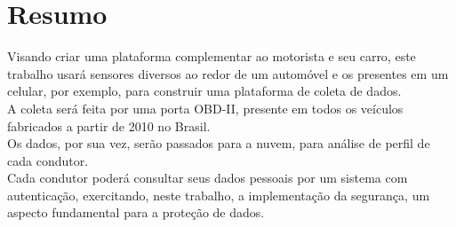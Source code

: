 \chapter*{Resumo}

\noindent Visando criar uma plataforma complementar ao motorista e seu carro, este trabalho usará sensores diversos ao redor de um automóvel e os presentes em um celular, por exemplo, para construir uma plataforma de coleta de dados.\\
A coleta será feita por uma porta OBD-II, presente em todos os veículos fabricados a partir de 2010 no Brasil.\\ 
Os dados, por sua vez, serão passados para a nuvem, para análise de perfil de cada condutor.\\ 
Cada condutor poderá consultar seus dados pessoais por um sistema com autenticação, exercitando, neste trabalho, a implementação da segurança, um aspecto fundamental para a proteção de dados.
